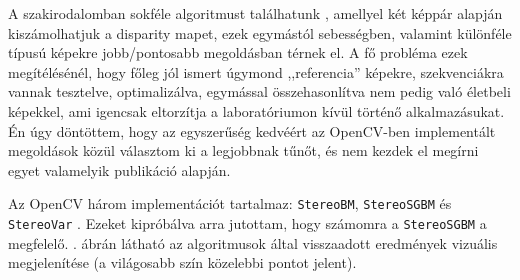 \documentclass[a4paper,oneside]{article}
\begin{document}
A szakirodalomban sokféle algoritmust találhatunk \cite{disparity-pixel} \cite{disparity-belief} \cite{disparity-dense-from-sparse}, amellyel két képpár alapján kiszámolhatjuk a disparity mapet, ezek egymástól sebességben, valamint különféle típusú képekre jobb/pontosabb megoldásban térnek el. A fő probléma ezek megítélésénél, hogy főleg jól ismert úgymond ,,referencia'' képekre, szekvenciákra vannak tesztelve, optimalizálva, egymással összehasonlítva nem pedig való életbeli képekkel, ami igencsak eltorzítja a laboratóriumon kívül történő alkalmazásukat. Én úgy döntöttem, hogy az egyszerűség kedvéért az OpenCV-ben implementált megoldások közül választom ki a legjobbnak tűnőt, és nem kezdek el megírni egyet valamelyik publikáció alapján.

Az OpenCV három implementációt tartalmaz: \texttt{StereoBM}, \texttt{StereoSGBM} \cite{disparity-sgbm} és \texttt{StereoVar} \cite{disparity-var}. Ezeket kipróbálva arra jutottam, hogy számomra a \texttt{StereoSGBM} a megfelelő. . ábrán látható az algoritmusok által visszaadott eredmények vizuális megjelenítése (a világosabb szín közelebbi pontot jelent).
\end{document}
